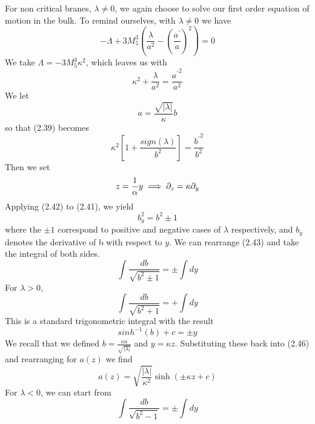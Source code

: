\documentclass[11pt]{report}
\numberwithin{equation}{chapter}
\begin{document}
\newpage
\noindent For non critical branes, $\lambda \neq 0$, we again choose to solve our first order equation of motion in the bulk. To remind ourselves, with $\lambda \neq 0$ we have
\begin{equation}
    -\Lambda+3M^3_5\left(\frac{\lambda}{a^2}-\left(\frac{a^\prime}{a}\right)^2\right)=0
\end{equation}
We take $\Lambda=-3M^3_5\kappa^2$, which leaves us with
\begin{equation}
    \kappa^2+\frac{\lambda}{a^2}=\frac{{a^\prime}^2}{a^2}
\end{equation}
We let 
\begin{equation}
    a=\frac{\sqrt{|\lambda|}}{\kappa}b
\end{equation}
so that (2.39) becomes
\begin{equation}
    \kappa^2\left[1+\frac{sign\left(\lambda\right)}{b^2}\right]=\frac{{b^\prime}^2}{b^2}
\end{equation}
Then we set 
\begin{equation}
    z=\frac{1}{\alpha}y \\
    \implies \partial_z =\kappa\partial_y
\end{equation}
Applying (2.42) to (2.41), we yield
\begin{equation}
    b^2_y=b^2\pm 1
\end{equation}
where the $\pm 1$ correspond to positive and negative cases of $\lambda $ respectively, and $b_y$ denotes the derivative of b with respect to $y$. We can rearrange (2.43) and take the integral of both sides.
\begin{equation}
    \int \frac{db}{\sqrt{b^2 \pm 1}}=\pm\int dy
\end{equation}
For $\lambda>0$, 
\begin{equation}
    \int \frac{db}{\sqrt{b^2 + 1}}=+\int dy
\end{equation}
This is a standard trigonometric integral with the result
\begin{equation}
    {sinh}^{-1}\left(b\right)+c= \pm y
\end{equation}
We recall that we defined $b=\frac{\kappa a}{\sqrt{|\lambda |}}$ and $y=\kappa z$. Substituting these back into (2.46) and rearranging for $a(z)$ we find
\begin{equation}
    a\left(z\right)=\sqrt{\frac{|\lambda |}{\kappa^2}}\sinh\left(\pm\kappa z+c\right)
\end{equation}
For $\lambda<0$, we can start from
\begin{equation}
    \int \frac{db}{\sqrt{b^2 - 1}}=\pm\int dy
\end{equation}
\end{document}
